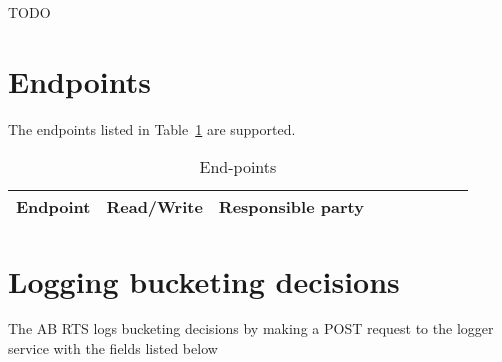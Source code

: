 \documentclass[letterpaper]{article}
\begin{document}
TODO \TBC 

\section{Endpoints}
The endpoints listed in Table~\ref{tbl_endpoints} are supported.
\begin{table}[hb]
\centering
\begin{tabular}{|l||l|l|l|l|l|l|l|l|}  \hline \hline
  {\bf Endpoint } & {\bf Read/Write} & {\bf Responsible party} \\ \hline \hline

\hline
\end{tabular}
\caption{End-points}
\label{tbl_endpoints}
\end{table}

\section{Logging bucketing decisions}

The AB RTS logs bucketing decisions by making a POST request to the logger
service with the fields listed below


\TBC
\end{document}
